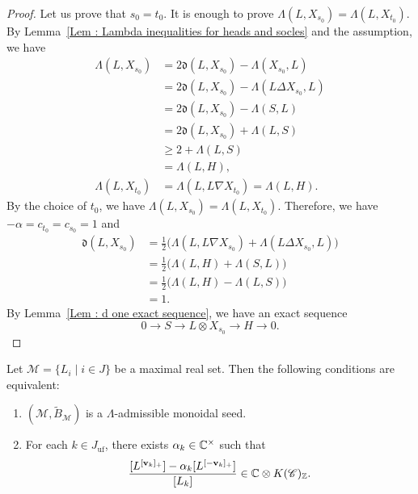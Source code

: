 \begin{proof}
Let us prove that $s_0 = t_0$.
It is enough to prove
$\Lambda(L, X_{s_0}) = \Lambda(L, X_{t_0})$.
By Lemma~\ref{Lem : Lambda inequalities for heads and socles}
and the assumption, we have
\[
\begin{aligned}
\Lambda(L, X_{s_0})
&= 2\mathfrak{d}(L, X_{s_0}) - \Lambda(X_{s_0}, L) \\
&= 2\mathfrak{d}(L, X_{s_0})
   - \Lambda(L \Delta X_{s_0}, L) \\
&= 2\mathfrak{d}(L, X_{s_0}) - \Lambda(S, L) \\
&= 2\mathfrak{d}(L, X_{s_0}) + \Lambda(L, S) \\
&\geq 2 + \Lambda(L, S) \\
&= \Lambda(L, H), \\
\Lambda(L, X_{t_0})
&= \Lambda(L, L \nabla X_{t_0}) = \Lambda(L, H).
\end{aligned}
\]
By the choice of $t_0$, we have
$\Lambda(L, X_{s_0}) = \Lambda(L, X_{t_0})$.
Therefore, we have $-\alpha = c_{t_0} = c_{s_0} = 1$ and
\[
\begin{aligned}
\mathfrak{d}(L, X_{s_0})
&= \frac{1}{2}\bigl(
\Lambda(L, L \nabla X_{s_0})
+ \Lambda(L \Delta X_{s_0}, L)\bigr) \\
&= \frac{1}{2}\bigl(\Lambda(L, H) + \Lambda(S, L)\bigr) \\
&= \frac{1}{2}\bigl(\Lambda(L, H) - \Lambda(L, S)\bigr) \\
&= 1.
\end{aligned}
\]
By Lemma~\ref{Lem : d one exact sequence},
we have an exact sequence
\[
0 \longrightarrow S \longrightarrow L \otimes X_{s_0}
\longrightarrow H \longrightarrow 0.
\]
\end{proof}

\begin{Lem}
\label{Lem : Lambda admissibility and binomial divisibility}
Let $\mathcal{M} = \{L_i \mid i \in J\}$ be a maximal real set.
Then the following conditions are equivalent:
\begin{enumerate}
    \item[(i)] $(\mathcal{M}, \widetilde{B}_{\mathcal{M}})$
    is a $\Lambda$-admissible monoidal seed.
    \item[(ii)] For each $k \in J_{\mathrm{uf}}$,
    there exists $\alpha_k \in \mathbb{C}^{\times}$ such that
    \[
    \frac{[L^{[\mathbf{v}_k]_+}]
    - \alpha_k[L^{[-\mathbf{v}_k]_+}]}{[L_k]}
    \in \mathbb{C} \otimes K(\mathscr{C})_{\mathbb{Z}}.
    \]
\end{enumerate}
\end{Lem}

